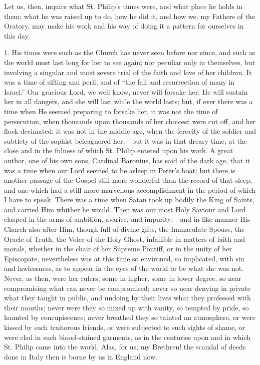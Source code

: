 Let us, then, inquire what St. Philip's times were,
and what place he holds in them; what he was raised up to
do, how he did it, and how we, my Fathers of the Oratory,
may make his work and his way of doing it a pattern for
ourselves in this day.

1. His times were such as the Church has never seen
before nor since, and such as the world must last long
for her to see again; nor peculiar only in themselves,
but involving a singular and most severe trial of the
faith and love of her children. It was a time of sifting
and peril, and of ``the fall and resurrection of many
in Israel.'' Our gracious Lord, we well know, never
will forsake her; He will sustain her in all dangers, and
she will last while the world lasts; but, if ever there
was a time when He seemed preparing to forsake her, it
was not the time of persecution, when thousands upon
thousands of her choicest were cut off, and her flock
decimated; it was not in the middle age, when the
ferocity of the soldier and subtlety of the sophist
beleaguered her,—but it was in that dreary time, at
the close and in the fulness of which St. Philip entered
upon his work. A great author, one of his own sons,
Cardinal Baronius, has said of the dark age, that it was
a time when our Lord seemed to be asleep in Peter's boat;
but there is another passage of the Gospel still more
wonderful than the record of that sleep, and one which
had a still more marvellous accomplishment in the period
of which I have to speak. There was a time when Satan
took up bodily the King of Saints, and carried Him
whither he would. Then was our most Holy Saviour and Lord
clasped in the arms of ambition, avarice, and
impurity:—and in like manner His Church also after
Him, though full of divine gifts, the Immaculate Spouse,
the Oracle of Truth, the Voice of the Holy Ghost,
infallible in matters of faith and morals, whether in the
chair of her Supreme Pontiff, or in the unity of her
Episcopate, nevertheless was at this time so environed,
so implicated, with sin and lawlessness, as to appear in
the eyes of the world to be what she was not. Never, as
then, were her rulers, some in higher, some in lower
degree, so near compromising what can never be
compromised; never so near denying in private what they
taught in public, and undoing by their lives what they
professed with their mouths; never were they so mixed up
with vanity, so tempted by pride, so haunted by
concupiscence; never breathed they so tainted an
atmosphere, or were kissed by such traitorous friends, or
were subjected to such sights of shame, or were clad in
such blood-stained garments, as in the centuries upon and
in which St. Philip came into the world. Alas, for us, my
Brethren! the scandal of deeds done in Italy then is
borne by us in England now.

